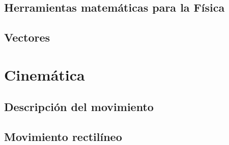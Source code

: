﻿\documentclass[11pt,letterpaper,openany]{book}
\newcommand{\rutaraiz}{../..}
\begin{document}
\chapter{Herramientas matemáticas para la Física}





\chapter{Vectores}





\part{Cinemática}



\chapter{Descripción del movimiento}





\chapter{Movimiento rectilíneo}




\end{document}
